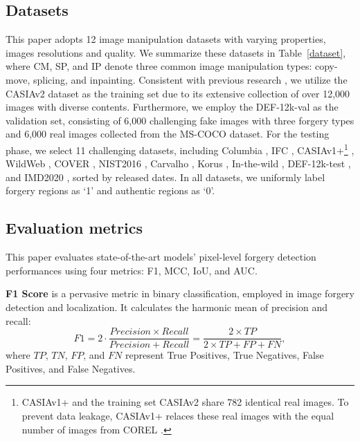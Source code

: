 \documentclass[10pt,journal,compsoc]{IEEEtran}
\begin{document}
\subsection{Datasets}  
This paper adopts 12 image manipulation datasets with varying properties, images resolutions and quality. We summarize these datasets in Table~\ref{dataset}, where CM, SP, and IP denote three common image manipulation types: copy-move, splicing, and inpainting. Consistent with previous research \cite{dong2022mvss, zhou2018learning, salloum2018image}, we utilize the CASIAv2 \cite{Dong2013} dataset as the training set due to its extensive collection of over 12,000 images with diverse contents. Furthermore, we employ the DEF-12k-val \cite{mahfoudi2019defacto} as the validation set, consisting of 6,000 challenging fake images with three forgery types and 6,000 real images collected from the MS-COCO \cite{lin2014microsoft} dataset. For the testing phase, we select 11 challenging datasets, including Columbia \cite{hsu2006columbia}, IFC \cite{IFC}, CASIAv1+\footnote{CASIAv1+ and the training set CASIAv2 share 782 identical real images. To prevent data leakage, CASIAv1+ relaces these real images with the equal number of images from COREL \cite{wang2001simplicity}.} \cite{dong2013casia}, WildWeb \cite{zampoglou2015detecting}, COVER \cite{wen2016coverage}, NIST2016 \cite{guan2019mfc}, Carvalho \cite{carvalho2015illuminant}, Korus \cite{korus2016evaluation}, In-the-wild \cite{huh2018fighting}, DEF-12k-test \cite{mahfoudi2019defacto}, and IMD2020 \cite{novozamsky2020imd2020}, sorted by released dates. In all  datasets, we uniformly label forgery regions as `1' and authentic regions as `0'.


\subsection{Evaluation metrics}
This paper evaluates state-of-the-art models' pixel-level forgery detection performances using four metrics: F1, MCC, IoU, and AUC. 



\noindent\textbf{F1 Score} is a pervasive metric in binary classification, employed in image forgery detection and localization. It calculates the harmonic mean of precision and recall:   
\begin{equation}
    \label{F1}
 F1 = 2 \cdot \frac{Precision \times Recall} {Precision + Recall} = \frac{2 \times TP} {2 \times TP + FP + FN},
\end{equation}
where $TP$, $TN$, $FP$, and $FN$ represent True Positives, True Negatives, False Positives, and False Negatives.  
\end{document}
